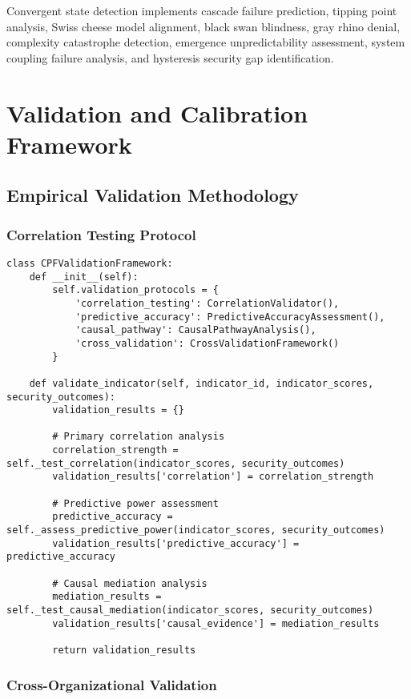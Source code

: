 \documentclass[11pt, onecolumn]{article}
\begin{document}
Convergent state detection implements cascade failure prediction, tipping point analysis, Swiss cheese model alignment, black swan blindness, gray rhino denial, complexity catastrophe detection, emergence unpredictability assessment, system coupling failure analysis, and hysteresis security gap identification.

\section{Validation and Calibration Framework}

\subsection{Empirical Validation Methodology}

\subsubsection{Correlation Testing Protocol}

\begin{lstlisting}
class CPFValidationFramework:
    def __init__(self):
        self.validation_protocols = {
            'correlation_testing': CorrelationValidator(),
            'predictive_accuracy': PredictiveAccuracyAssessment(),
            'causal_pathway': CausalPathwayAnalysis(),
            'cross_validation': CrossValidationFramework()
        }
        
    def validate_indicator(self, indicator_id, indicator_scores, security_outcomes):
        validation_results = {}
        
        # Primary correlation analysis
        correlation_strength = self._test_correlation(indicator_scores, security_outcomes)
        validation_results['correlation'] = correlation_strength
        
        # Predictive power assessment
        predictive_accuracy = self._assess_predictive_power(indicator_scores, security_outcomes)
        validation_results['predictive_accuracy'] = predictive_accuracy
        
        # Causal mediation analysis
        mediation_results = self._test_causal_mediation(indicator_scores, security_outcomes)
        validation_results['causal_evidence'] = mediation_results
        
        return validation_results
\end{lstlisting}

\subsubsection{Cross-Organizational Validation}
\end{document}
